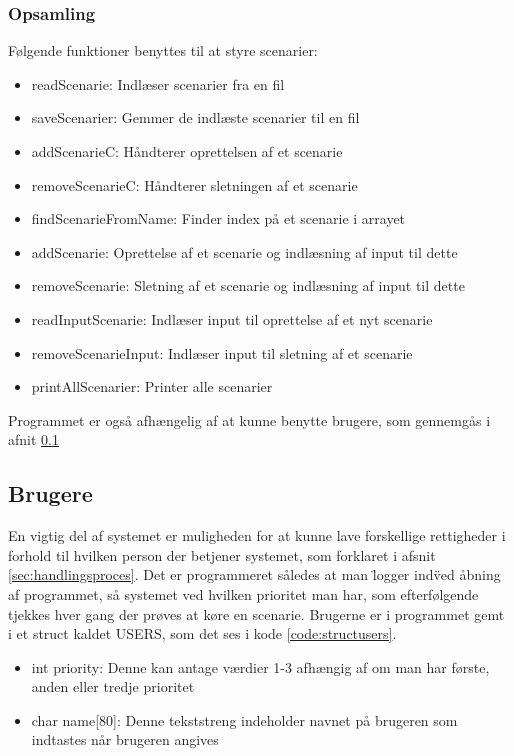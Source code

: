 \subsubsection*{Opsamling}
Følgende funktioner benyttes til at styre scenarier:
\begin{itemize}
    \item readScenarie: Indlæser scenarier fra en fil
    \item saveScenarier: Gemmer de indlæste scenarier til en fil
    \item addScenarieC: Håndterer oprettelsen af et scenarie
    \item removeScenarieC: Håndterer sletningen af et scenarie
    \item findScenarieFromName: Finder index på et scenarie i arrayet
    \item addScenarie: Oprettelse af et scenarie og indlæsning af input til dette
    \item removeScenarie: Sletning af et scenarie og indlæsning af input til dette
    \item readInputScenarie: Indlæser input til oprettelse af et nyt scenarie
    \item removeScenarieInput: Indlæser input til sletning af et scenarie
    \item printAllScenarier: Printer alle scenarier
\end{itemize}

Programmet er også afhængelig af at kunne benytte brugere, som gennemgås i afnit \ref{sec:implemusers}

\subsection{Brugere}\label{sec:implemusers} %
En vigtig del af systemet er muligheden for at kunne lave forskellige rettigheder i forhold til hvilken person der betjener systemet, som forklaret i afsnit \ref{sec:handlingsproces}. Det er programmeret således at man \"logger ind\" ved åbning af programmet, så systemet ved hvilken prioritet man har, som efterfølgende tjekkes hver gang der prøves at køre en scenarie. Brugerne er i programmet gemt i et struct kaldet USERS, som det ses i kode \ref{code:structusers}.



\begin{itemize}
    \item int priority: Denne kan antage værdier 1-3 afhængig af om man har første, anden eller tredje prioritet
    \item char name[80]: Denne tekststreng indeholder navnet på brugeren som indtastes når brugeren angives
\end{itemize}

